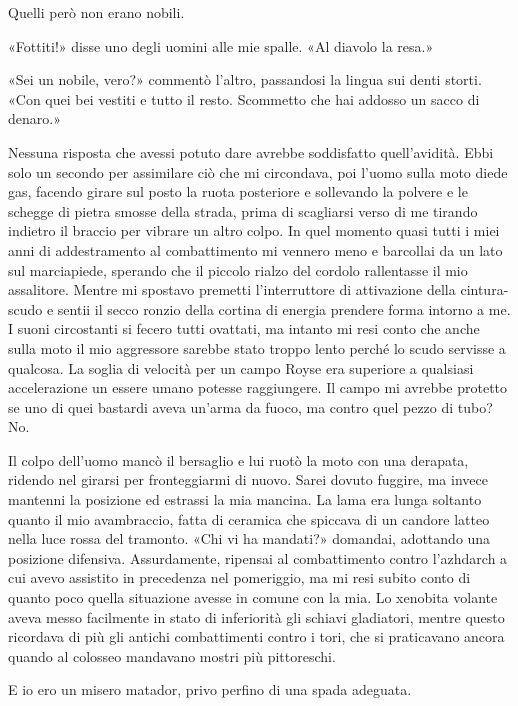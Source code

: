 Quelli però non erano nobili.

«Fottiti!» disse uno degli uomini alle mie spalle. «Al diavolo la resa.»

«Sei un nobile, vero?» commentò l'altro, passandosi la lingua sui denti
storti. «Con quei bei vestiti e tutto il resto. Scommetto che hai
addosso un sacco di denaro.»

Nessuna risposta che avessi potuto dare avrebbe soddisfatto
quell'avidità. Ebbi solo un secondo per assimilare ciò che mi
{circondava}, poi l'uomo sulla moto diede gas, facendo girare sul posto
la ruota posteriore e sollevando la polvere e le schegge di pietra
smosse della strada, prima di scagliarsi verso di me tirando indietro il
braccio per vibrare un altro colpo. In quel momento quasi tutti i miei
anni di addestramento al combattimento mi vennero meno e barcollai da un
lato sul marciapiede, sperando che il piccolo rialzo del cordolo
rallentasse il mio assalitore. Mentre mi spostavo premetti
l'interruttore di attivazione della cintura-scudo e sentii il secco
ronzio della cortina di energia prendere forma intorno a me. I suoni
circostanti si fecero tutti ovattati, ma intanto mi resi conto che anche
sulla moto il mio aggressore sarebbe stato troppo lento perché lo scudo
servisse a qualcosa. La soglia di velocità per un campo Royse era
superiore a qualsiasi accelerazione un essere umano potesse raggiungere.
Il campo mi avrebbe protetto se uno di quei bastardi aveva un'arma da
fuoco, ma contro quel pezzo di tubo? No.

Il colpo dell'uomo mancò il bersaglio e lui ruotò la moto con una
derapata, ridendo nel girarsi per fronteggiarmi di nuovo. Sarei dovuto
fuggire, ma invece mantenni la posizione ed estrassi la mia mancina. La
lama era lunga soltanto quanto il mio avambraccio, fatta di ceramica che
spiccava di un candore latteo nella luce rossa del tramonto. «Chi vi ha
mandati?» domandai, adottando una posizione difensiva. Assurdamente,
ripensai al combattimento contro l'azhdarch a cui avevo assistito in
precedenza nel pomeriggio, ma mi resi subito conto di quanto poco quella
situazione avesse in comune con la mia. Lo xenobita volante aveva messo
facilmente in stato di inferiorità gli schiavi gladiatori, mentre questo
ricordava di più gli antichi combattimenti contro i tori, che si
praticavano ancora quando al colosseo mandavano mostri più pittoreschi.

E io ero un misero matador, privo perfino di una spada adeguata.

